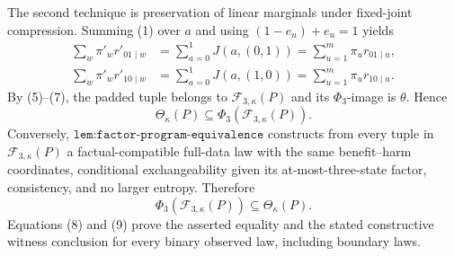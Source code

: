 The second technique is preservation of linear marginals under fixed-joint
compression.  Summing (1) over \(a\) and using
\((1-e_u)+e_u=1\) yields
\[
\begin{aligned}
 \sum_w\pi'_w r'_{01\mid w}
 &=\sum_{a=0}^1J(a,(0,1))
 =\sum_{u=1}^m\pi_u r_{01\mid u},\\
 \sum_w\pi'_w r'_{10\mid w}
 &=\sum_{a=0}^1J(a,(1,0))
 =\sum_{u=1}^m\pi_u r_{10\mid u}.
 \tag{7}
\end{aligned}
\]
By (5)--(7), the padded tuple belongs to
\(\mathcal F_{3,\kappa}(P)\) and its \(\Phi_3\)-image is \(\theta\).  Hence
\[
 \Theta_\kappa(P)\subseteq\Phi_3(\mathcal F_{3,\kappa}(P)).
 \tag{8}
\]
Conversely, \(\texttt{lem:factor-program-equivalence}\) constructs from every
tuple in \(\mathcal F_{3,\kappa}(P)\) a factual-compatible full-data law with
the same benefit--harm coordinates, conditional exchangeability given its
at-most-three-state factor, consistency, and no larger entropy.  Therefore
\[
 \Phi_3(\mathcal F_{3,\kappa}(P))\subseteq\Theta_\kappa(P).
 \tag{9}
\]
Equations (8) and (9) prove the asserted equality and the stated constructive
witness conclusion for every binary observed law, including boundary laws.